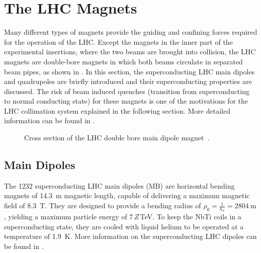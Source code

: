 \section{The LHC Magnets}

Many different types of magnets provide the guiding and confining forces required for the operation of the LHC. Except the magnets in the inner part of the experimental insertions, where the two beams are brought into collision, the LHC magnets are double-bore magnets in which both beams circulate in separated beam pipes, as shown in . In this section, the superconducting LHC main dipoles and quadrupoles are briefly introduced and their superconducting properties are discussed. The risk of beam induced quenches (transition from superconducting to normal conducting state) for these magnets is one of the motivations for the LHC collimation system explained in the following section. More detailed information can be found in \citedr.

\begin{figure}[b]
  \centering
  \caption{Cross section of the LHC double bore main dipole magnet~\cite{Valeriane:843195}.}  
  \label{pic:16070405}
  \end{figure}


\subsection{Main Dipoles}

The 1232 superconducting LHC main dipoles (MB) are horizontal bending magnets of 14.3~m magnetic length, capable of delivering a maximum magnetic field of 8.3~T. They are designed to provide a bending radius of $\rho_0=\frac{1}{h_x} = 2804~\text{m}$, yielding a maximum particle energy of $7\,Z\,$TeV. To keep the NbTi coils in a superconducting state, they are cooled with liquid helium to be operated at a temperature of 1.9~K. More information on the superconducting LHC dipoles can be found in \citedr.
%
